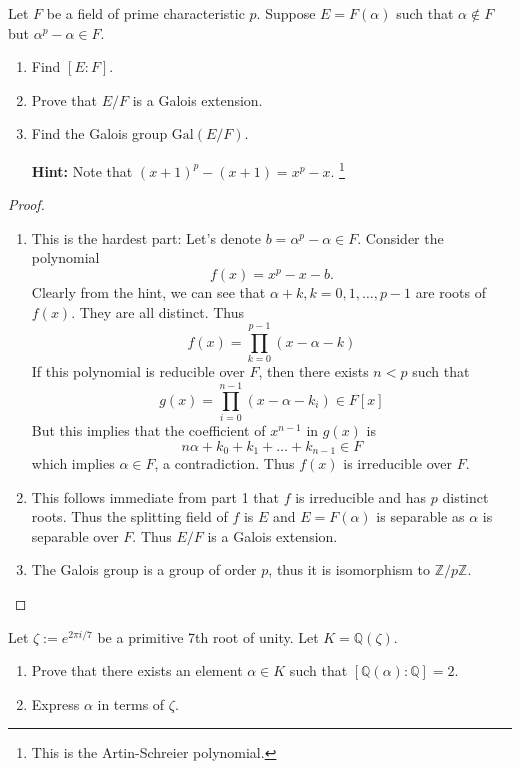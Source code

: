 \documentclass[11pt,letterpaper]{article}
\DeclareMathOperator{\1}{\mathbbm{1}}
\begin{document}
\begin{exercise}\label{Galois theory }
  Let $F$ be a field of prime characteristic $p$. Suppose $E = F(\alpha)$ such that
  $\alpha \notin F$ but $\alpha^p -\alpha \in F$.
  \begin{enumerate}
    \item Find $[E:F]$.
    \item Prove that $E/F$ is a Galois extension.
    \item Find the Galois group $\text{Gal}(E/F)$.

          \textbf{Hint:} Note that $(x+1)^p -(x+1)=x^p -x$. \footnote{This is the Artin-Schreier polynomial.}

  \end{enumerate}
\end{exercise}
\begin{proof}
  \hfill \\
  \begin{enumerate}
    \item This is the hardest part: Let's denote $b=\alpha^p - \alpha \in F$. Consider the
          polynomial $$f(x) = x^p - x - b.$$
          Clearly from the hint, we can see that $\alpha+k, k = 0,1,\ldots,p-1$ are roots of $f(x)$. They are all distinct.
          Thus
          \[f(x) = \prod_{k=0}^{p-1}(x-\alpha-k)\]
          If this polynomial is reducible over $F$, then there exists $n < p$ such that
          \[g(x) = \prod_{i=0}^{n-1}(x-\alpha-k_i) \in F[x]\]
          But this implies that the coefficient of $x^{n-1}$ in $g(x)$ is
          \[n\alpha + k_0+k_1+\ldots+k_{n-1} \in F\]
          which implies $\alpha \in F$, a contradiction. Thus $f(x)$ is irreducible over $F$.
    \item This follows immediate from part 1 that $f$ is irreducible and has $p$ distinct roots. Thus the splitting field of $f$ is $E$ and $E=F(\alpha)$
          is separable as $\alpha$ is separable over $F$. Thus $E/F$ is a Galois extension.
    \item The Galois group is a group of order $p$, thus it is isomorphism to $\mathbb{Z}/p\mathbb{Z}$.
  \end{enumerate}
\end{proof}
\begin{exercise}
  Let $\zeta := e^{2\pi i/7}$ be a primitive 7th root of unity. Let $K = \mathbb{Q}(\zeta)$.
  \begin{enumerate}
    \item Prove that there exists an element $\alpha \in K$ such that  $[\mathbb{Q}(\alpha):\mathbb{Q}] = 2$.
    \item Express $\alpha$ in terms of $\zeta$.
  \end{enumerate}
\end{exercise}
\end{document}
